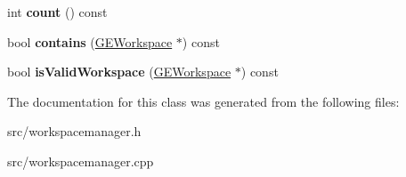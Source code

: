\begin{DoxyCompactItemize}
\item 
\hypertarget{class_workspace_manager_abf92651eb58410cea42b2bb1cc667711}{int {\bfseries count} () const }\label{class_workspace_manager_abf92651eb58410cea42b2bb1cc667711}

\item 
\hypertarget{class_workspace_manager_a0d7bd685d494b45b1dbe4f6c1030d6ec}{bool {\bfseries contains} (\hyperlink{class_g_e_workspace}{G\-E\-Workspace} $\ast$) const }\label{class_workspace_manager_a0d7bd685d494b45b1dbe4f6c1030d6ec}

\item 
\hypertarget{class_workspace_manager_af89c297da0be7d2e1dde66e808dde0d5}{bool {\bfseries is\-Valid\-Workspace} (\hyperlink{class_g_e_workspace}{G\-E\-Workspace} $\ast$) const }\label{class_workspace_manager_af89c297da0be7d2e1dde66e808dde0d5}

\end{DoxyCompactItemize}


The documentation for this class was generated from the following files\-:\begin{DoxyCompactItemize}
\item 
src/workspacemanager.\-h\item 
src/workspacemanager.\-cpp\end{DoxyCompactItemize}
